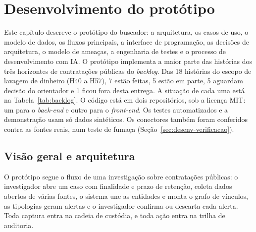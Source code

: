 \begingroup
\setlength{\emergencystretch}{3em}

\chapter{Desenvolvimento do protótipo}
\label{cap:desenvolvimento}

Este capítulo descreve o protótipo do buscador: a arquitetura, os casos de
uso, o modelo de dados, os fluxos principais, a interface de programação, as
decisões de arquitetura, o modelo de ameaças, a engenharia de testes e o processo de
desenvolvimento com IA. O protótipo implementa a maior parte das histórias
dos três horizontes de contratações públicas do \textit{backlog}. Das 18
histórias do escopo de lavagem de dinheiro (H40 a H57), 7 estão feitas, 5
estão em parte, 5 aguardam decisão do orientador e 1 ficou fora desta
entrega. A situação de cada uma está na Tabela~\ref{tab:backlog}. O código
está em dois repositórios, sob a licença
MIT: um para o
\textit{back-end} e outro para o \textit{front-end}. Os testes automatizados
e a demonstração usam só dados sintéticos. Os conectores também foram
conferidos contra as fontes reais, num teste de fumaça
(Seção~\ref{sec:desenv-verificacao}).

\section{Visão geral e arquitetura}
\label{sec:desenv-arquitetura}

O protótipo segue o fluxo de uma investigação sobre contratações públicas:
o investigador abre um caso com finalidade e prazo de retenção, coleta dados
abertos de várias fontes, o sistema une as entidades e monta o grafo de
vínculos, as tipologias geram alertas e o investigador confirma ou descarta
cada alerta. Toda captura entra na cadeia de custódia, e toda ação entra na
trilha de auditoria.

